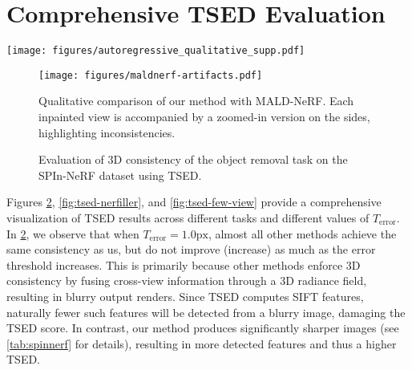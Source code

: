 \section{Comprehensive TSED Evaluation}
\label{supp:sec:tsed-eval}

\begin{figure*}[t]
    \centering
    \texttt{[image: figures/autoregressive\_qualitative\_supp.pdf]}
    \caption{
    A step-by-step illustration of autoregressive inpainting in the first stage, where a wide-baseline subset of the scene is progressively inpainted. Note the consistency preserved throughout the process.
    }
    \label{fig:autoregressive-qualitative}
\end{figure*}

\begin{figure}[t]
    \centering
    \texttt{[image: figures/maldnerf-artifacts.pdf]}
    \caption{
    Qualitative comparison of our method with MALD-NeRF. Each inpainted view is accompanied by a zoomed-in version on the sides, highlighting inconsistencies.
    }
    \label{fig:maldnerf-artifacts}
\end{figure}

\begin{figure}[t]
    \centering
    \begin{subfigure}{\linewidth}
        
    \end{subfigure}
    \vspace{-0.4in}
    \caption{
    Evaluation of 3D consistency of the object removal task on the SPIn-NeRF dataset using TSED.
    }
    \label{fig:tsed-spinnerf}
\end{figure}

Figures \ref{fig:tsed-spinnerf}, \ref{fig:tsed-nerfiller}, and \ref{fig:tsed-few-view}
provide a comprehensive visualization of TSED results across different tasks and different values of $T_\text{error}$. In \cref{fig:tsed-spinnerf}, we observe that when $T_\text{error} = 1.0 \text{px}$, almost all other methods achieve the same consistency as us, but do not improve (increase) as much as the error threshold increases.
This is primarily because other methods enforce 3D consistency by fusing cross-view information through a 3D radiance field, resulting in blurry output renders.
Since TSED computes SIFT features, naturally fewer such features will be detected from a blurry image, damaging the TSED score. In contrast, our method produces significantly sharper images (see \cref{tab:spinnerf} for details), resulting in more detected features and thus a higher TSED.

